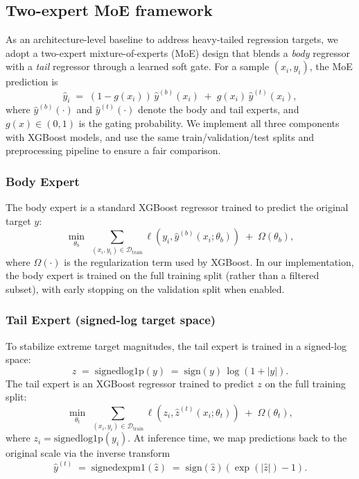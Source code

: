 \documentclass[11pt,conference,onecolumn]{IEEEtran}
\begin{document}
\subsection{Two-expert MoE framework}
As an architecture-level baseline to address heavy-tailed regression targets, we adopt a two-expert mixture-of-experts (MoE) design that blends a \emph{body} regressor with a \emph{tail} regressor through a learned soft gate. For a sample $(x_i,y_i)$, the MoE prediction is
\begin{equation}
    \hat{y}_i \;=\; (1-g(x_i))\,\hat{y}^{(b)}(x_i) \;+\; g(x_i)\,\hat{y}^{(t)}(x_i),
\end{equation}
where $\hat{y}^{(b)}(\cdot)$ and $\hat{y}^{(t)}(\cdot)$ denote the body and tail experts, and $g(x)\in(0,1)$ is the gating probability. We implement all three components with XGBoost models, and use the same train/validation/test splits and preprocessing pipeline to ensure a fair comparison.

\subsubsection{Body Expert}
The body expert is a standard XGBoost regressor trained to predict the original target $y$:
\begin{equation}
    \min_{\theta_b}\;\sum_{(x_i,y_i)\in\mathcal{D}_{\mathrm{train}}} 
    \ell\!\left(y_i,\hat{y}^{(b)}(x_i;\theta_b)\right) \;+\; \Omega(\theta_b),
\end{equation}
where $\Omega(\cdot)$ is the regularization term used by XGBoost. In our implementation, the body expert is trained on the full training split (rather than a filtered subset), with early stopping on the validation split when enabled.

\subsubsection{Tail Expert (signed-log target space)}
To stabilize extreme target magnitudes, the tail expert is trained in a signed-log space:
\begin{equation}
    z \;=\; \mathrm{signedlog1p}(y) \;=\; \mathrm{sign}(y)\,\log(1+|y|).
\end{equation}
The tail expert is an XGBoost regressor trained to predict $z$ on the full training split:
\begin{equation}
    \min_{\theta_t}\;\sum_{(x_i,y_i)\in\mathcal{D}_{\mathrm{train}}} 
    \ell\!\left(z_i,\hat{z}^{(t)}(x_i;\theta_t)\right) \;+\; \Omega(\theta_t),
\end{equation}
where $z_i=\mathrm{signedlog1p}(y_i)$. At inference time, we map predictions back to the original scale via the inverse transform
\begin{equation}
    \hat{y}^{(t)} \;=\; \mathrm{signedexpm1}(\hat{z}) \;=\; \mathrm{sign}(\hat{z})\left(\exp(|\hat{z}|)-1\right).
\end{equation}
\end{document}
